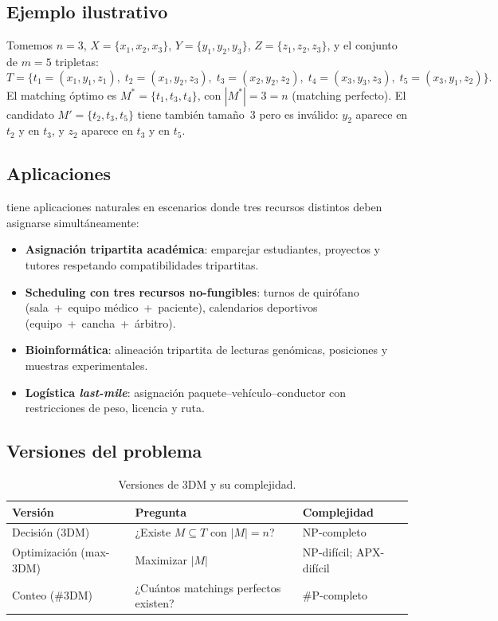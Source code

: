 \subsection{Ejemplo ilustrativo}
\label{sec:problema:ejemplo}

Tomemos $n=3$, $X=\{x_1,x_2,x_3\}$, $Y=\{y_1,y_2,y_3\}$,
$Z=\{z_1,z_2,z_3\}$, y el conjunto de $m=5$ tripletas:
\[
T = \bigl\{
  t_1{=}(x_1,y_1,z_1),\;
  t_2{=}(x_1,y_2,z_3),\;
  t_3{=}(x_2,y_2,z_2),\;
  t_4{=}(x_3,y_3,z_3),\;
  t_5{=}(x_3,y_1,z_2)
\bigr\}.
\]
El matching óptimo es
$M^* = \{t_1, t_3, t_4\}$, con $|M^*|=3=n$ (matching perfecto).
El candidato $M' = \{t_2, t_3, t_5\}$ tiene también tamaño~3 pero es inválido:
$y_2$ aparece en $t_2$ y en $t_3$, y $z_2$ aparece en $t_3$ y en $t_5$.

\subsection{Aplicaciones}
\label{sec:problema:aplicaciones}

\threedm{} tiene aplicaciones naturales en escenarios donde tres recursos
distintos deben asignarse simultáneamente:
\begin{itemize}
  \item \textbf{Asignación tripartita académica}: emparejar estudiantes,
        proyectos y tutores respetando compatibilidades tripartitas.
  \item \textbf{Scheduling con tres recursos no-fungibles}: turnos de
        quirófano (sala~+~equipo médico~+~paciente), calendarios deportivos
        (equipo~+~cancha~+~árbitro).
  \item \textbf{Bioinformática}: alineación tripartita de lecturas genómicas,
        posiciones y muestras experimentales.
  \item \textbf{Logística \textit{last-mile}}: asignación paquete--vehículo--conductor
        con restricciones de peso, licencia y ruta.
\end{itemize}

\subsection{Versiones del problema}
\label{sec:problema:versiones}

\begin{table}[htbp]
\centering
\caption{Versiones de 3DM y su complejidad.}
\label{tab:versiones}
\begin{tabular}{lp{5.5cm}l}
\toprule
Versión & Pregunta & Complejidad \\
\midrule
Decisión (3DM) & ¿Existe $M\subseteq T$ con $|M|=n$? & NP-completo \cite{karp1972} \\
Optimización (max-3DM) & Maximizar $|M|$ & NP-difícil; APX-difícil \cite{kann1991} \\
Conteo (\#3DM) & ¿Cuántos matchings perfectos existen? & \#P-completo \cite{valiant1979} \\
\bottomrule
\end{tabular}
\end{table}
